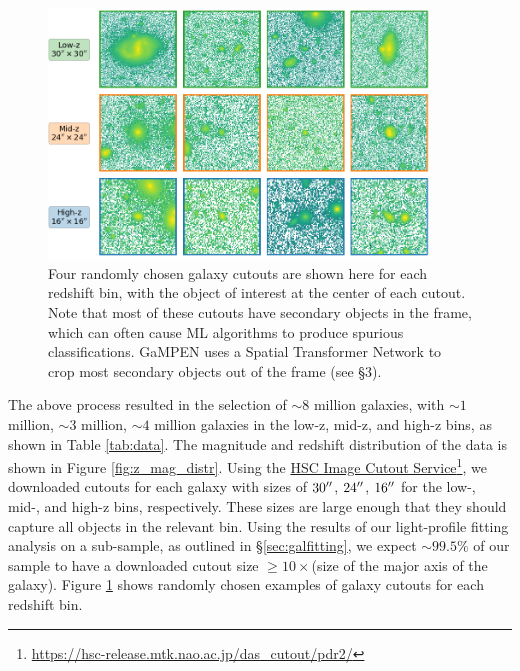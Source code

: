 \documentclass[linenumbers,twocolumn,twocolappendix]{aastex631}
\newcommand\gampen{GaMPEN}
\begin{document}
\begin{CJK*}{UTF8}{gbsn}
\begin{figure}[htb]
    \centering
    \includegraphics[width = 0.9\textwidth]{real_data_examples.png}
    \caption{Four randomly chosen galaxy cutouts are shown here for each redshift bin, with the object of interest at the center of each cutout. Note that most of these cutouts have secondary objects in the frame, which can often cause ML algorithms to produce spurious classifications. \gampen{} uses a Spatial Transformer Network to crop most secondary objects out of the frame %
    (see \S 3).}
    \label{fig:real_data_eg}
\end{figure}


The above process resulted in the selection of $\sim 8$ million galaxies, with $\sim1$ million, $\sim3$ million, $\sim4$ million galaxies in the low-z, mid-z, and high-z bins, as shown in Table \ref{tab:data}. The magnitude and redshift distribution of the data is shown in Figure \ref{fig:z_mag_distr}. Using the \href{https://hsc-release.mtk.nao.ac.jp/das_cutout/pdr2/}{HSC Image Cutout Service}\footnote{\href{https://hsc-release.mtk.nao.ac.jp/das_cutout/pdr2/}{https://hsc-release.mtk.nao.ac.jp/das\_cutout/pdr2/}}, we downloaded cutouts for each galaxy with sizes of $30\mbox{$^{\prime\prime}$}$, $24\mbox{$^{\prime\prime}$}$, $16\mbox{$^{\prime\prime}$}$ for the low-, mid-, and high-z bins, respectively. These sizes are large enough that they should capture all objects in the relevant bin. Using the results of our light-profile fitting analysis on a sub-sample, as outlined in \S \ref{sec:galfitting}, we expect $\sim99.5\%$ of our sample to have a downloaded cutout size $\geq10\times$(size of the major axis of the galaxy). Figure \ref{fig:real_data_eg} shows randomly chosen examples of galaxy cutouts for each redshift bin. 




\end{CJK*}
\end{document}
